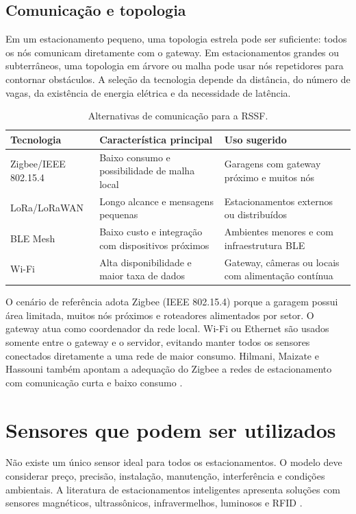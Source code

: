 \documentclass[11pt,a4paper]{article}
\begin{document}
\subsection{Comunicação e topologia}
Em um estacionamento pequeno, uma topologia estrela pode ser suficiente: todos os nós comunicam diretamente com o gateway. Em estacionamentos grandes ou subterrâneos, uma topologia em árvore ou malha pode usar nós repetidores para contornar obstáculos. A seleção da tecnologia depende da distância, do número de vagas, da existência de energia elétrica e da necessidade de latência.

\begin{table}[t]
\centering
\small
\caption{Alternativas de comunicação para a RSSF.}
\label{tab:comunicacao}
\begin{tabularx}{\textwidth}{L{2.7cm}YY}
\toprule
Tecnologia & Característica principal & Uso sugerido \\
\midrule
Zigbee/IEEE 802.15.4 & Baixo consumo e possibilidade de malha local & Garagens com gateway próximo e muitos nós \\
LoRa/LoRaWAN & Longo alcance e mensagens pequenas & Estacionamentos externos ou distribuídos \\
BLE Mesh & Baixo custo e integração com dispositivos próximos & Ambientes menores e com infraestrutura BLE \\
Wi-Fi & Alta disponibilidade e maior taxa de dados & Gateway, câmeras ou locais com alimentação contínua \\
\bottomrule
\end{tabularx}
\end{table}

O cenário de referência adota Zigbee (IEEE 802.15.4) porque a garagem possui área limitada, muitos nós próximos e roteadores alimentados por setor. O gateway atua como coordenador da rede local. Wi-Fi ou Ethernet são usados somente entre o gateway e o servidor, evitando manter todos os sensores conectados diretamente a uma rede de maior consumo. Hilmani, Maizate e Hassouni também apontam a adequação do Zigbee a redes de estacionamento com comunicação curta e baixo consumo \cite{hilmani2018}.

\section{Sensores que podem ser utilizados}
Não existe um único sensor ideal para todos os estacionamentos. O modelo deve considerar preço, precisão, instalação, manutenção, interferência e condições ambientais. A literatura de estacionamentos inteligentes apresenta soluções com sensores magnéticos, ultrassônicos, infravermelhos, luminosos e RFID \cite{chen2016,hilmani2018}.
\end{document}
